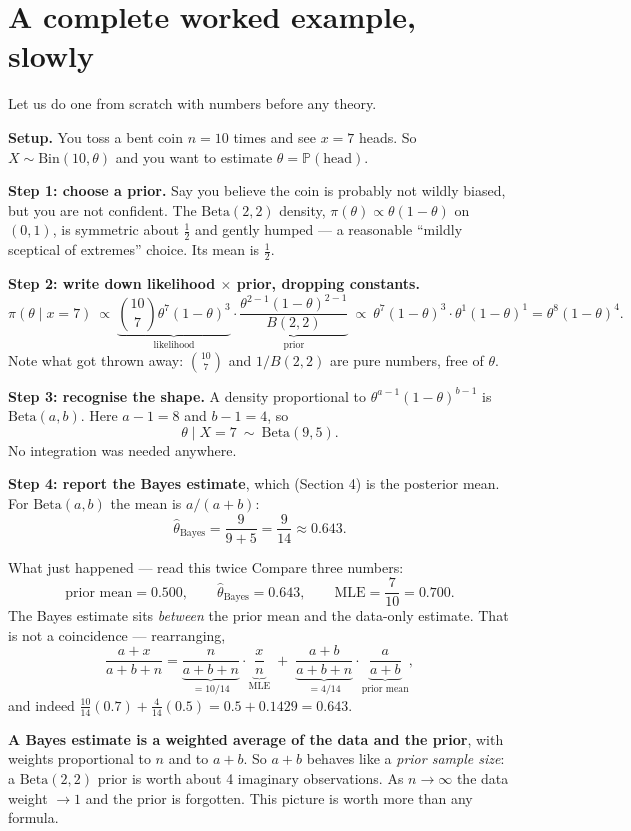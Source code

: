 \documentclass[11pt]{article}
\newcommand{\Prob}{\mathbb{P}}
\begin{document}
\section{A complete worked example, slowly}

Let us do one from scratch with numbers before any theory.

\textbf{Setup.} You toss a bent coin $n=10$ times and see $x=7$ heads. So
$X\sim\mathrm{Bin}(10,\theta)$ and you want to estimate $\theta=\Prob(\text{head})$.

\textbf{Step 1: choose a prior.} Say you believe the coin is probably not wildly biased, but
you are not confident. The $\mathrm{Beta}(2,2)$ density,
$\pi(\theta)\propto\theta(1-\theta)$ on $(0,1)$, is symmetric about $\tfrac12$ and gently
humped --- a reasonable ``mildly sceptical of extremes'' choice. Its mean is $\tfrac12$.

\textbf{Step 2: write down likelihood $\times$ prior, dropping constants.}
\[
\pi(\theta\mid x=7)\ \propto\
\underbrace{\binom{10}{7}\theta^{7}(1-\theta)^{3}}_{\text{likelihood}}
\cdot
\underbrace{\frac{\theta^{2-1}(1-\theta)^{2-1}}{B(2,2)}}_{\text{prior}}
\ \propto\ \theta^{7}(1-\theta)^{3}\cdot\theta^{1}(1-\theta)^{1}
=\theta^{8}(1-\theta)^{4}.
\]
Note what got thrown away: $\binom{10}{7}$ and $1/B(2,2)$ are pure numbers, free of $\theta$.

\textbf{Step 3: recognise the shape.} A density proportional to
$\theta^{a-1}(1-\theta)^{b-1}$ is $\mathrm{Beta}(a,b)$. Here
$a-1=8$ and $b-1=4$, so
\[
\theta\mid X=7\ \sim\ \mathrm{Beta}(9,5).
\]
No integration was needed anywhere.

\textbf{Step 4: report the Bayes estimate}, which (Section 4) is the posterior mean. For
$\mathrm{Beta}(a,b)$ the mean is $a/(a+b)$:
\[
\widehat\theta_{\text{Bayes}}=\frac{9}{9+5}=\frac{9}{14}\approx0.643 .
\]

\begin{idea}{What just happened --- read this twice}
Compare three numbers:
\[
\text{prior mean}=0.500,\qquad
\widehat\theta_{\text{Bayes}}=0.643,\qquad
\text{MLE}=\frac{7}{10}=0.700 .
\]
The Bayes estimate sits \emph{between} the prior mean and the data-only estimate. That is not
a coincidence --- rearranging,
\[
\frac{a+x}{a+b+n}
=\underbrace{\frac{n}{a+b+n}}_{=10/14}\cdot\underbrace{\frac{x}{n}}_{\text{MLE}}
\;+\;\underbrace{\frac{a+b}{a+b+n}}_{=4/14}\cdot\underbrace{\frac{a}{a+b}}_{\text{prior mean}} ,
\]
and indeed $\tfrac{10}{14}(0.7)+\tfrac{4}{14}(0.5)=0.5+0.1429=0.643$. \checkmark

\smallskip
\textbf{A Bayes estimate is a weighted average of the data and the prior}, with weights
proportional to $n$ and to $a+b$. So $a+b$ behaves like a \emph{prior sample size}: a
$\mathrm{Beta}(2,2)$ prior is worth about 4 imaginary observations. As $n\to\infty$ the data
weight $\to1$ and the prior is forgotten. This picture is worth more than any formula.
\end{idea}
\end{document}
